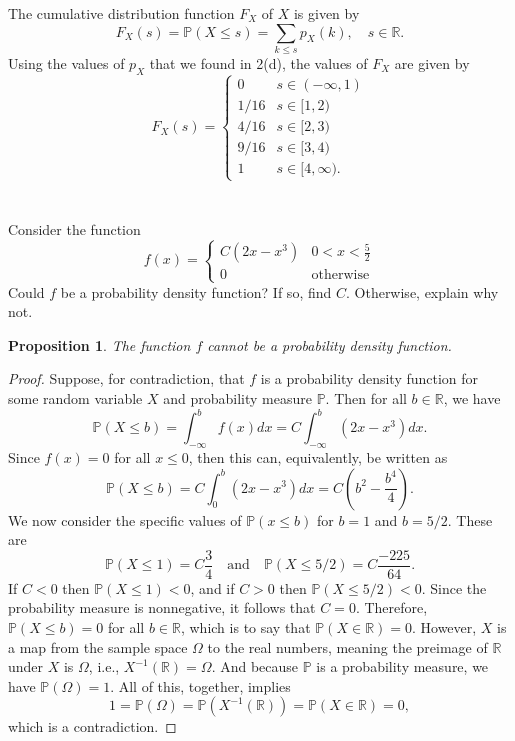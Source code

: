 \documentclass[12pt]{article}
\newenvironment{problem}
    {\begin{lrbox}{\mybox}\begin{minipage}{0.98\textwidth}}
    {\end{minipage}\end{lrbox}\framebox[\textwidth]{\usebox{\mybox}}}
\newtheorem{proposition}{Proposition}
\newcommand{\isp}[1]{\quad\text{#1}\quad}
\newcommand{\R}{\mathbb{R}}
\renewcommand{\P}{\mathbb{P}}
\begin{document}
The cumulative distribution function $F_X$ of $X$ is given by
\[
    F_X(s) = \P(X \leq s) = \sum_{k \leq s} p_X(k), \quad s \in \R.
\]
Using the values of $p_X$ that we found in 2(d), the values of $F_X$ are given by
\[
    F_X(s) = \begin{cases}
        0 & s \in (-\infty, 1) \\
        1/16 & s \in [1, 2) \\
        4/16 & s \in [2, 3) \\
        9/16 & s \in [3, 4) \\
        1 & s \in [4, \infty).
    \end{cases}
\]


\newpage
\section{}
\begin{problem}
    Consider the function
    \[
        f(x) = \begin{cases}
            C(2x - x^3)     & 0 < x < \frac52 \\
            0               & \text{otherwise}
        \end{cases}
    \]
    Could $f$ be a probability density function? If so, find $C$. Otherwise, explain why not.
\end{problem}

\begin{proposition}
    The function $f$ cannot be a probability density function.
\end{proposition}

\begin{proof}
    Suppose, for contradiction, that $f$ is a probability density function for some random variable $X$ and probability measure $\P$. Then for all $b \in \R$, we have
    \[
        \P(X \leq b) = \int_{-\infty}^{b} f(x) dx = C\int_{-\infty}^{b} (2x - x^3) dx.
    \]
    Since $f(x) = 0$ for all $x \leq 0$, then this can, equivalently, be written as
    \[
         \P(X \leq b) = C\int_{0}^{b} (2x - x^3) dx = C \left(b^2 - \frac{b^4}{4} \right).
    \]
    We now consider the specific values of $\P(x \leq b)$ for $b = 1$ and $b = 5/2$. These are
    \[
        \P(X \leq 1) = C \frac34 \isp{and} \P(X \leq 5/2) = C \frac{-225}{64}.
    \]
    If $C < 0$ then $\P(X \leq 1) < 0$, and if $C > 0$ then $\P(X \leq 5/2) < 0$. Since the probability measure is nonnegative, it follows that $C = 0$. Therefore, $\P(X \leq b) = 0$ for all $b \in \R$, which is to say that $\P(X \in \R) = 0$. However, $X$ is a map from the sample space $\Omega$ to the real numbers, meaning the preimage of $\R$ under $X$ is $\Omega$, i.e., $X^{-1}(\R) = \Omega$. And because $\P$ is a probability measure, we have $\P(\Omega) = 1$. All of this, together, implies
    \[
        1 = \P(\Omega) = \P(X^{-1}(\R)) = \P(X \in \R) = 0,
    \]
    which is a contradiction.
    
\end{proof}
\end{document}
